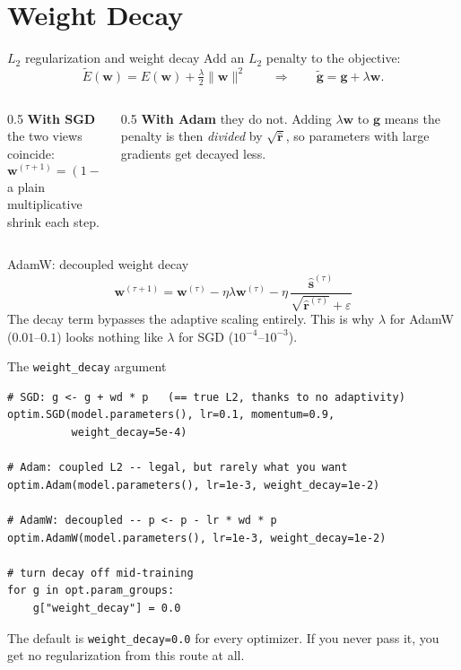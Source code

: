 \documentclass[10pt,aspectratio=169]{beamer}
\begin{document}
\section{Weight Decay}

\begin{frame}{$L_2$ regularization and weight decay}
Add an $L_2$ penalty to the objective:
\[
\tilde{E}(\mathbf{w}) = E(\mathbf{w}) + \tfrac{\lambda}{2}\lVert\mathbf{w}\rVert^2
\qquad\Longrightarrow\qquad
\tilde{\mathbf{g}} = \mathbf{g} + \lambda\mathbf{w}.
\]
\vspace{0.1cm}
\begin{columns}[T]
\begin{column}{0.5\textwidth}
\textbf{With SGD} the two views coincide:
\[
\mathbf{w}^{(\tau+1)} = (1-\eta\lambda)\,\mathbf{w}^{(\tau)} - \eta\, \mathbf{g}^{(\tau)}
\]
a plain multiplicative shrink each step.
\end{column}
\begin{column}{0.5\textwidth}
\textbf{With Adam} they do not. Adding $\lambda\mathbf{w}$ to $\mathbf{g}$ means the penalty is then
\emph{divided} by $\sqrt{\hat{\mathbf{r}}}$, so parameters with large gradients get decayed less.
\end{column}
\end{columns}
\vspace{0.25cm}
\begin{block}{AdamW: decoupled weight decay}
\[
\mathbf{w}^{(\tau+1)} = \mathbf{w}^{(\tau)} - \eta\lambda\mathbf{w}^{(\tau)}
- \eta\,\frac{\hat{\mathbf{s}}^{(\tau)}}{\sqrt{\hat{\mathbf{r}}^{(\tau)}}+\varepsilon}
\]
The decay term bypasses the adaptive scaling entirely. This is why $\lambda$ for AdamW
($0.01$--$0.1$) looks nothing like $\lambda$ for SGD ($10^{-4}$--$10^{-3}$).
\end{block}
\end{frame}

\begin{frame}[fragile]{The \texttt{weight\_decay} argument}
\begin{lstlisting}
# SGD: g <- g + wd * p   (== true L2, thanks to no adaptivity)
optim.SGD(model.parameters(), lr=0.1, momentum=0.9,
          weight_decay=5e-4)

# Adam: coupled L2 -- legal, but rarely what you want
optim.Adam(model.parameters(), lr=1e-3, weight_decay=1e-2)

# AdamW: decoupled -- p <- p - lr * wd * p
optim.AdamW(model.parameters(), lr=1e-3, weight_decay=1e-2)

# turn decay off mid-training
for g in opt.param_groups:
    g["weight_decay"] = 0.0
\end{lstlisting}
The default is \texttt{weight\_decay=0.0} for every optimizer. If you never pass it, you get no
regularization from this route at all.
\end{frame}
\end{document}
